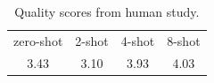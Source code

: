 \begin{table}[!t]
\caption{Quality scores from human study.}
\label{table:few_shots_2}
\begin{center}
\begin{tabular}{cccc}
\toprule
zero-shot & 2-shot & 4-shot & 8-shot\\
3.43 & 3.10 & 3.93 & 4.03 \\
\bottomrule
\end{tabular}
\end{center}
\end{table}